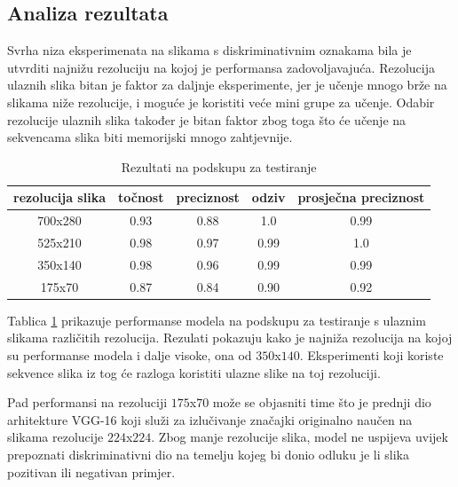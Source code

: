 \documentclass[times, utf8, diplomski, numeric]{fer}
\begin{document}
\subsection{Analiza rezultata}
Svrha niza eksperimenata na slikama s diskriminativnim oznakama bila je utvrditi najnižu rezoluciju na kojoj je performansa zadovoljavajuća.
Rezolucija ulaznih slika bitan je faktor za daljnje eksperimente, jer je učenje mnogo brže na slikama niže rezolucije, i moguće je koristiti veće mini grupe za učenje.
Odabir rezolucije ulaznih slika također je bitan faktor zbog toga što će učenje na sekvencama slika biti memorijski mnogo zahtjevnije.
\begin{table}[H]
\centering
\caption{Rezultati na podskupu za testiranje}
\label{score:single_hand_test_resolutions}
\begin{tabular}{|c|c|c|c|c|}
\hline
rezolucija slika & točnost & preciznost & odziv & prosječna preciznost \\ \hline
700x280          &     0.93    &   0.88         &   1.0    &       0.99               \\ \hline
525x210          &    0.98     &    0.97        &   0.99    &       1.0               \\ \hline
350x140          &     0.98    &    0.96        &   0.99    &        0.99              \\ \hline
175x70           &    0.87     &    0.84        &   0.90    &      0.92                \\ \hline
\end{tabular}
\end{table}
Tablica \ref{score:single_hand_test_resolutions} prikazuje performanse modela na podskupu za testiranje s ulaznim slikama različitih rezolucija.
Rezulati pokazuju kako je najniža rezolucija na kojoj su performanse modela i dalje visoke, ona od $350$x$140$. 
Eksperimenti koji koriste sekvence slika iz tog će razloga koristiti ulazne slike na toj rezoluciji.

Pad performansi na rezoluciji $175$x$70$ može se objasniti time što je prednji dio arhitekture VGG-16 koji
služi za izlučivanje značajki originalno naučen na slikama rezolucije $224$x$224$. 
Zbog manje rezolucije slika, model ne uspijeva uvijek prepoznati diskriminativni dio na temelju kojeg bi donio odluku je li slika pozitivan ili negativan primjer.
\end{document}
